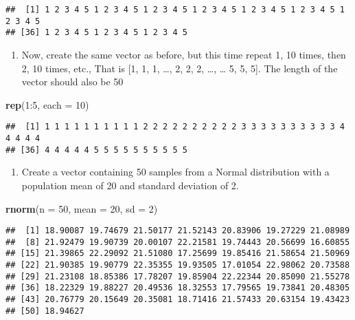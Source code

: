 \documentclass[]{book}
\newenvironment{Shaded}{\begin{snugshade}}{\end{snugshade}}
\newcommand{\KeywordTok}[1]{\textcolor[rgb]{0.13,0.29,0.53}{\textbf{{#1}}}}
\newcommand{\DataTypeTok}[1]{\textcolor[rgb]{0.13,0.29,0.53}{{#1}}}
\newcommand{\DecValTok}[1]{\textcolor[rgb]{0.00,0.00,0.81}{{#1}}}
\newcommand{\NormalTok}[1]{{#1}}
\providecommand{\tightlist}{%
  \setlength{\itemsep}{0pt}\setlength{\parskip}{0pt}}
\begin{document}
\begin{verbatim}
##  [1] 1 2 3 4 5 1 2 3 4 5 1 2 3 4 5 1 2 3 4 5 1 2 3 4 5 1 2 3 4 5 1 2 3 4 5
## [36] 1 2 3 4 5 1 2 3 4 5 1 2 3 4 5
\end{verbatim}

\begin{enumerate}
\def\labelenumi{\arabic{enumi}.}
\setcounter{enumi}{6}
\tightlist
\item
  Now, create the same vector as before, but this time repeat 1, 10
  times, then 2, 10 times, etc., That is {[}1, 1, 1, \ldots{}, 2, 2, 2,
  \ldots{}, \ldots{} 5, 5, 5{]}. The length of the vector should also be
  50
\end{enumerate}

\begin{Shaded}
\begin{Highlighting}[]
\KeywordTok{rep}\NormalTok{(}\DecValTok{1}\NormalTok{:}\DecValTok{5}\NormalTok{, }\DataTypeTok{each =} \DecValTok{10}\NormalTok{)}
\end{Highlighting}
\end{Shaded}

\begin{verbatim}
##  [1] 1 1 1 1 1 1 1 1 1 1 2 2 2 2 2 2 2 2 2 2 3 3 3 3 3 3 3 3 3 3 4 4 4 4 4
## [36] 4 4 4 4 4 5 5 5 5 5 5 5 5 5 5
\end{verbatim}

\begin{enumerate}
\def\labelenumi{\arabic{enumi}.}
\setcounter{enumi}{7}
\tightlist
\item
  Create a vector containing 50 samples from a Normal distribution with
  a population mean of 20 and standard deviation of 2.
\end{enumerate}

\begin{Shaded}
\begin{Highlighting}[]
\KeywordTok{rnorm}\NormalTok{(}\DataTypeTok{n =} \DecValTok{50}\NormalTok{, }\DataTypeTok{mean =} \DecValTok{20}\NormalTok{, }\DataTypeTok{sd =} \DecValTok{2}\NormalTok{)}
\end{Highlighting}
\end{Shaded}

\begin{verbatim}
##  [1] 18.90087 19.74679 21.50177 21.52143 20.83906 19.27229 21.08989
##  [8] 21.92479 19.90739 20.00107 22.21581 19.74443 20.56699 16.60855
## [15] 21.39865 22.29092 21.51080 17.25699 19.85416 21.58654 21.50969
## [22] 21.90385 19.90779 22.35355 19.93505 17.01054 22.98062 20.73588
## [29] 21.23108 18.85386 17.78207 19.85904 22.22344 20.85090 21.55278
## [36] 18.22329 19.88227 20.49536 18.32553 17.79565 19.73841 20.48305
## [43] 20.76779 20.15649 20.35081 18.71416 21.57433 20.63154 19.43423
## [50] 18.94627
\end{verbatim}
\end{document}
